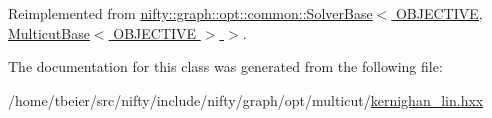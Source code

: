 Reimplemented from \hyperlink{classnifty_1_1graph_1_1opt_1_1common_1_1SolverBase_a6a5d77ee514c4b5f44d1908c1000f0ff}{nifty\+::graph\+::opt\+::common\+::\+Solver\+Base$<$ O\+B\+J\+E\+C\+T\+I\+V\+E, Multicut\+Base$<$ O\+B\+J\+E\+C\+T\+I\+V\+E $>$ $>$}.



The documentation for this class was generated from the following file\+:\begin{DoxyCompactItemize}
\item 
/home/tbeier/src/nifty/include/nifty/graph/opt/multicut/\hyperlink{kernighan__lin_8hxx}{kernighan\+\_\+lin.\+hxx}\end{DoxyCompactItemize}

